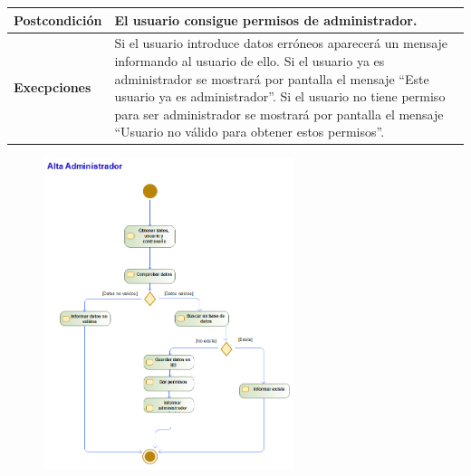 \begin{table}[H]
\begin{tabularx}{0.8\textwidth}{|p{3.5cm}|X|}
        \hline
        \textbf{Postcondición}    & El usuario consigue permisos de administrador.                                                                                                                                                                                                                                                                                                      \\
        \hline
        \textbf{Execpciones}      & Si el usuario introduce datos erróneos aparecerá un mensaje informando al usuario de ello. Si el usuario ya es administrador se mostrará por pantalla el mensaje ``Este usuario ya es administrador''. Si el usuario no tiene permiso para ser administrador se mostrará por pantalla el mensaje ``Usuario no válido para obtener estos permisos''. \\
        \hline
    \end{tabularx}
\end{table}
\begin{figure}[H]
    \centering
    \includegraphics[width=0.65\textwidth]{Use_Cases/alta_admin.png}
\end{figure}
\newpage
